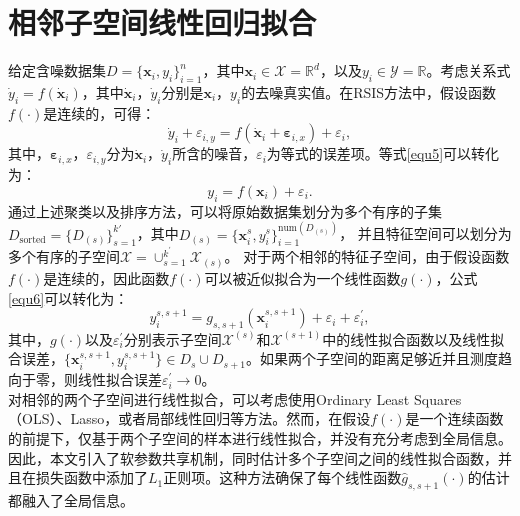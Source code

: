 \documentclass{NauThesis}
\begin{document}
\section{相邻子空间线性回归拟合}

给定含噪数据集$D=\{\boldsymbol{x}_i,y_i\}_{i=1}^n$，其中$\boldsymbol{x}_i\in \mathcal{X}=\mathbb{R}^d$，以及$y_i\in\mathcal{Y}=\mathbb{R}$。考虑关系式$\dot{y}_i=f(\dot{\boldsymbol{x}}_i)$，其中$\dot{\boldsymbol{x}}_i$，$\dot{y}_i$分别是$\boldsymbol{x}_i$，$y_i$的去噪真实值。在RSIS方法中，假设函数$f(\cdot)$是连续的，可得：
\begin{equation} \label{equ5}
\dot{y}_i+\varepsilon_{i,y}=f(\dot{\boldsymbol{x}}_i+\boldsymbol{\varepsilon}_{i,x})+\varepsilon_i,
\end{equation}
其中，$\boldsymbol{\varepsilon}_{i,x}$，$\varepsilon_{i,y}$分为$\dot{\boldsymbol{x}}_i$，$\dot{y}_i$所含的噪音，$\varepsilon_i$为等式的误差项。等式\eqref{equ5}可以转化为：
\begin{equation} \label{equ6}
    y_i=f(\boldsymbol{x}_i)+\varepsilon_i.     
\end{equation}
\hspace*{2em}通过上述聚类以及排序方法，可以将原始数据集划分为多个有序的子集$D_\text{sorted}=\{D_{(s)}\}_{s=1}^{k'}$，其中$D_{(s)}=\{ \boldsymbol{x}_i^s,y_i^s \}_{i=1}^{\text{num}(D_{(s)})}$，
并且特征空间可以划分为多个有序的子空间$\mathcal{X}=\cup_{s=1}^{k^\prime}\mathcal{X}_{(s)}$。
对于两个相邻的特征子空间，由于假设函数$f(\cdot)$是连续的，因此函数$f(\cdot)$可以被近似拟合为一个线性函数$g(\cdot)$，公式\eqref{equ6}可以转化为：
\begin{equation} \label{equ7}
    y_i^{s,s+1}=g_{s,s+1}(\boldsymbol{x}_i^{s,s+1})+\varepsilon_i+\varepsilon_i^\prime,
\end{equation}
其中，$g(\cdot)$以及$\varepsilon_i^\prime$分别表示子空间$\mathcal{X}^{(s)}$和$\mathcal{X}^{(s+1)}$中的线性拟合函数以及线性拟合误差，$\{\boldsymbol{x}_i^{s,s+1},y_i^{s,s+1}\}\in D_s\cup D_{s+1}$。如果两个子空间的距离足够近并且测度趋向于零，则线性拟合误差$\varepsilon_i^\prime\rightarrow0$。
\\\hspace*{2em}对相邻的两个子空间进行线性拟合，可以考虑使用Ordinary Least Squares （OLS）、Lasso，或者局部线性回归等方法\cite{ref66,ref67,ref68}。然而，在假设$f(\cdot)$是一个连续函数的前提下，仅基于两个子空间的样本进行线性拟合，并没有充分考虑到全局信息。因此，本文引入了软参数共享机制\cite{ref3,ref69,ref70,ref71,ref72}，同时估计多个子空间之间的线性拟合函数，并且在损失函数中添加了$L_1$正则项。这种方法确保了每个线性函数$\hat{g}_{s,s+1}(\cdot)$的估计都融入了全局信息。
\end{document}
